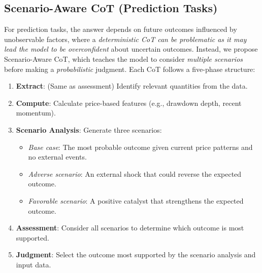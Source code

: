 \subsection{Scenario-Aware CoT (Prediction Tasks)}
\label{sec:scenario_cot}

For prediction tasks, the answer depends on future outcomes influenced by unobservable factors, 
where a \textit{deterministic CoT can be problematic as it may lead the model to be overconfident} about 
uncertain outcomes.
Instead, we propose Scenario-Aware CoT, which teaches the model to consider \textit{multiple scenarios} before making a 
\textit{probabilistic}
judgment.
Each 
CoT follows a five-phase structure:
\begin{enumerate}[leftmargin=1.8cm, labelsep=0.3cm]
\item[\textbf{Phase 1.}] \textbf{Extract}: (Same as assessment) Identify relevant quantities from the data.
\item[\textbf{Phase 2.}] \textbf{Compute}: Calculate price-based features (e.g., drawdown depth, recent momentum).
\item[\textbf{Phase 3.}] \textbf{Scenario Analysis}: Generate three scenarios:
  \begin{itemize}[leftmargin=-0.85cm]
  \item \textit{Base case}: The most probable outcome given current price patterns and no external events.
  \item \textit{Adverse scenario}: An external shock that could reverse the expected outcome.
  \item \textit{Favorable scenario}: A positive catalyst that strengthens the expected outcome.
  \end{itemize}
\item[\textbf{Phase 4.}] \textbf{Assessment}: Consider all scenarios to determine which outcome is most supported.
\item[\textbf{Phase 5.}] \textbf{Judgment}: Select the outcome most supported by the scenario analysis and input data.
\end{enumerate}

